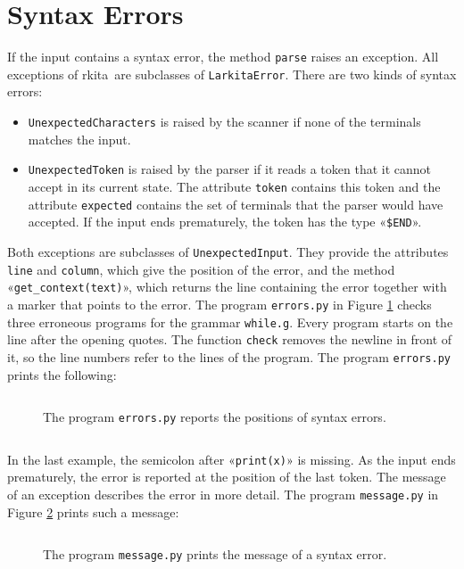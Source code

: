 \documentclass[11pt,a4paper]{article}
\makeatletter
\newcommand{\fakesc}[1]{\resizebox{!}{0.99ex}{\textls[90]{\MakeUppercase{#1}}}}
\def\@simtextsc#1#2\@nil{\MakeUppercase{#1}\fakesc{#2}}
\newcommand{\simtextsc}[1]{%
  \ifmmode\text{\@simtextsc#1\@nil}\else\@simtextsc#1\@nil\fi}
\newcommand{\Larkita}{\simtextsc{Larkita}}
\newenvironment{unbreakable}{\par\noindent\begin{minipage}{\linewidth}}{\end{minipage}\par}
\newcommand{\codefigure}[5][]{\begin{figure}[H]%
  \inputminted[numbers = left, numbersep = 0.3cm, #1]{#2}{examples/#3}%
  \vspace*{-0.3cm}%
  \caption{#5}\label{#4}\end{figure}}
\newcommand{\pythonfile}[2]{\codefigure{python3}{#1}{fig:#1}{#2}}
\newcommand{\resultfile}[2][\normalsize]{\begin{unbreakable}%
  \inputminted[fontsize = #1, breaklines]{text}{examples/output/#2.txt}\end{unbreakable}}
\makeatother
\begin{document}
\section{Syntax Errors}
\label{sec:errors}
If the input contains a syntax error, the method \texttt{parse} raises an exception.  All exceptions of
\Larkita\ are subclasses of \texttt{LarkitaError}.  There are two kinds of syntax errors:
\begin{itemize}
\item \texttt{UnexpectedCharacters} is raised by the scanner if none of the terminals matches the input.
\item \texttt{UnexpectedToken} is raised by the parser if it reads a token that it cannot accept in its
      current state.  The attribute \texttt{token} contains this token and the attribute \texttt{expected}
      contains the set of terminals that the parser would have accepted.  If the input ends prematurely, the
      token has the type «\verb|$END|».
\end{itemize}
Both exceptions are subclasses of \texttt{UnexpectedInput}.  They provide the attributes \texttt{line} and
\texttt{column}, which give the position of the error, and the method «\verb|get_context(text)|», which returns
the line containing the error together with a marker that points to the error.  The program
\texttt{errors.py} in Figure \ref{fig:errors.py} checks three erroneous programs for the grammar
\texttt{while.g}.  Every program starts on the line after the opening quotes.  The function \texttt{check}
removes the newline in front of it, so the line numbers refer to the lines of the program.  The program
\texttt{errors.py} prints the following:
\pythonfile{errors.py}{The program \texttt{errors.py} reports the positions of syntax errors.}
\resultfile{errors}
In the last example, the semicolon after «\verb|print(x)|» is missing.  As the input ends prematurely, the
error is reported at the position of the last token.  The message of an exception describes the error in
more detail.  The program \texttt{message.py} in Figure \ref{fig:message.py} prints such a message:
\pythonfile{message.py}{The program \texttt{message.py} prints the message of a syntax error.}
\resultfile[\small]{message}
\end{document}
